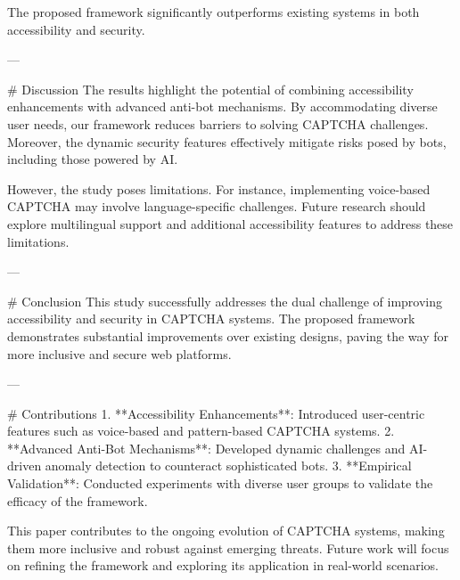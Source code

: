 The proposed framework significantly outperforms existing systems in both accessibility and security.

---

# Discussion  
The results highlight the potential of combining accessibility enhancements with advanced anti-bot mechanisms. By accommodating diverse user needs, our framework reduces barriers to solving CAPTCHA challenges. Moreover, the dynamic security features effectively mitigate risks posed by bots, including those powered by AI.

However, the study poses limitations. For instance, implementing voice-based CAPTCHA may involve language-specific challenges. Future research should explore multilingual support and additional accessibility features to address these limitations.

---

# Conclusion  
This study successfully addresses the dual challenge of improving accessibility and security in CAPTCHA systems. The proposed framework demonstrates substantial improvements over existing designs, paving the way for more inclusive and secure web platforms.

---

# Contributions  
1. **Accessibility Enhancements**: Introduced user-centric features such as voice-based and pattern-based CAPTCHA systems.  
2. **Advanced Anti-Bot Mechanisms**: Developed dynamic challenges and AI-driven anomaly detection to counteract sophisticated bots.  
3. **Empirical Validation**: Conducted experiments with diverse user groups to validate the efficacy of the framework.

This paper contributes to the ongoing evolution of CAPTCHA systems, making them more inclusive and robust against emerging threats. Future work will focus on refining the framework and exploring its application in real-world scenarios.